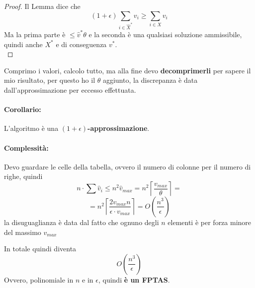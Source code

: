 \begin{proof}
	Il Lemma dice che
	$$ (1 + \epsilon) \sum_{i \in \hat X^\ast} v_i \geq \sum_{i \in X} v_i $$
	Ma la prima parte è $\leq \hat v^\ast \theta$ e la seconda è una qualsiasi soluzione ammissibile, quindi anche $X^\ast$ e di conseguenza $v^\ast$.\\
\end{proof}

Comprimo i valori, calcolo tutto, ma alla fine devo \textbf{decomprimerli} per sapere il mio risultato, per questo ho il $\theta$ aggiunto, la discrepanza è data dall'approssimazione per eccesso effettuata.\\

\paragraph{Corollario:} L'algoritmo è una \textbf{$(1 + \epsilon)$-approssimazione}.\\

\paragraph{Complessità:} Devo guardare le celle della tabella, ovvero il numero di colonne per il numero di righe, quindi 
$$ n \cdot \sum \hat v_i \leq n^2 \hat v_{max} = n^2 \left\lceil \frac{v_{max}}{\theta} \right\rceil = $$
$$ = n^2 \left\lceil \frac{2 v_{max} n}{\epsilon \cdot v_{max}} \right\rceil = O\left(\frac{n^3}{\epsilon}\right) $$
la disuguaglianza è data dal fatto che ognuno degli $n$ elementi è per forza minore del massimo $v_{max}$

In totale quindi diventa
$$ O \left(\frac{n^3}{\epsilon}\right)$$
Ovvero, polinomiale in $n$ e in $\epsilon$, quindi \textbf{è un FPTAS}.\\

\newpage

